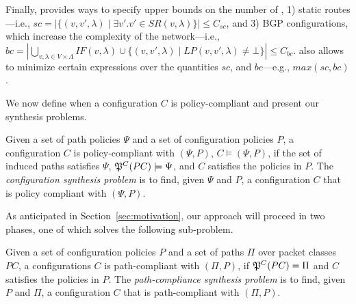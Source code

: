 Finally, \name provides ways to specify upper bounds on the number of
,
1) static routes---i.e., $sc=|\{(v, v', \lambda)\mid \exists v'. v' \in SR(v,\lambda)\}|\leq C_{sc}$, and
3) BGP configurations, which increase the complexity of the network---i.e., 
$bc=|\bigcup_{v,\lambda\in V\times\Lambda} IF(v,\lambda)\cup \{(v,v',\lambda)\mid LP(v,v',\lambda)\neq \bot\}|\leq C_{bc}$.
\name also allows to minimize certain expressions over the quantities $sc$, and $bc$---e.g., $max(sc, bc)$. 




\noindent We now define when a configuration $C$ is policy-compliant
and present our synthesis problems.
\begin{definition} \label{def:policycompliance}
	Given a set of path policies $\Psi$ and a set of configuration policies $P$,
	a configuration $C$ is policy-compliant with $(\Psi,P)$,
	$C \models (\Psi,P)$, if the set of
	induced paths satisfies $\Psi$, $\mathfrak{P}^C(PC) \models \Psi$,
	and $C$ satisfies the policies in $P$.
	The \emph{configuration synthesis problem} is to find, given $\Psi$ and $P$,
a configuration $C$ that is policy compliant with $(\Psi,P)$.
\end{definition}

As anticipated in Section~\ref{sec:motivation}, our approach will proceed in two phases,
one of which solves the following sub-problem.  
\begin{definition} \label{def:pathcompliance}
Given a set of configuration policies $P$
and a set of paths $\Pi$ over packet classes $PC$,
	a configurations $C$ is path-compliant with 
	$(\Pi,P)$,
	if $\mathfrak{P}^C(PC)=\Pi$ and $C$ satisfies the policies in $P$.
	The \emph{path-compliance synthesis problem} is to find, given $P$ and $\Pi$,
a configuration $C$ that is path-compliant with $(\Pi,P)$.
\end{definition}



